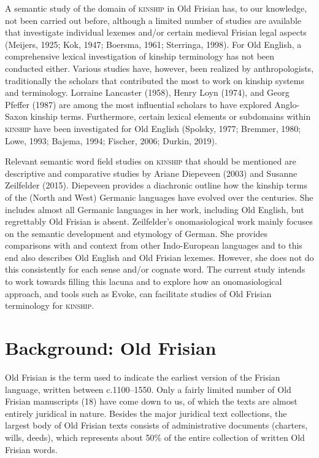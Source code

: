 A semantic study of the domain of \textsc{kinship} in Old Frisian has, to our knowledge, not been carried out before, although a limited number of studies are available that investigate individual lexemes and/or certain medieval Frisian legal aspects (Meijers, 1925; Kok, 1947; Boersma, 1961; Sterringa, 1998). For Old English, a comprehensive lexical investigation of kinship terminology has not been conducted either. Various studies have, however, been realized by anthropologists, traditionally the scholars that contributed the most to work on kinship systems and terminology. Lorraine Lancaster (1958), Henry Loyn (1974), and Georg Pfeffer (1987) are among the most influential scholars to have explored Anglo-Saxon kinship terms. Furthermore, certain lexical elements or subdomains within \textsc{kinship} have been investigated for Old English (Spolsky, 1977; Bremmer, 1980; Lowe, 1993; Bajema, 1994; Fischer, 2006; Durkin, 2019).

Relevant semantic word field studies on \textsc{kinship} that should be mentioned are descriptive and comparative studies by Ariane Diepeveen (2003) and Susanne Zeilfelder (2015). Diepeveen provides a diachronic outline how the kinship terms of the (North and West) Germanic languages have evolved over the centuries. She includes almost all Germanic languages in her work, including Old English, but regrettably Old Frisian is absent. Zeilfelder’s onomasiological work mainly focuses on the semantic development and etymology of German. She provides comparisons with and context from other Indo-European languages and to this end also describes Old English and Old Frisian lexemes. However, she does not do this consistently for each sense and/or cognate word. The current study intends to work towards filling this lacuna and to explore how an onomasiological approach, and tools such as Evoke, can facilitate studies of Old Frisian terminology for \textsc{kinship}.

\section{Background: Old Frisian}
\label{sect:Stolk2021b:Background}

Old Frisian is the term used to indicate the earliest version of the Frisian language, written between c.1100–1550. Only a fairly limited number of Old Frisian manuscripts (18) have come down to us, of which the texts are almost entirely juridical in nature.  Besides the major juridical text collections, the largest body of Old Frisian texts consists of administrative documents (charters, wills, deeds), which represents about 50\% of the entire collection of written Old Frisian words. 

